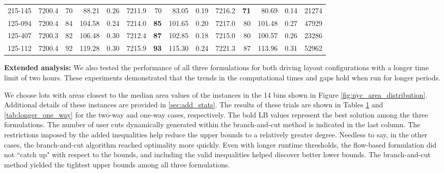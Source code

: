 \documentclass[10pt]{article}
\theoremstyle{definition}
\begin{document}
\begin{table}[H]
\begin{tabular}{l|rrrr|rrrr|rrrrr}
    215-145 & 7200.4 & 70    & 88.21 & 0.26  & 7211.9 & 70    & 83.05 & 0.19  & 7216.2 & \textbf{71} & 80.69 & 0.14  & 21274 \\
    125-094 & 7200.4 & 84    & 104.58 & 0.24  & 7214.0 & \textbf{85} & 101.65 & 0.20  & 7217.0 & 80    & 101.48 & 0.27  & 47929 \\
    125-407 & 7200.3 & 82    & 106.48 & 0.30  & 7212.4 & \textbf{87} & 102.85 & 0.18  & 7215.0 & 80    & 100.57 & 0.26  & 23286 \\
    125-112 & 7200.4 & 92    & 119.28 & 0.30  & 7215.9 & \textbf{93} & 115.30 & 0.24  & 7221.3 & 87    & 113.96 & 0.31  & 52962 \\
    \hline
    \end{tabular}%
  \label{tab:longer_two_way}%
\end{table}%


\textbf{Extended analysis: }We also tested the performance of all three formulations for both driving layout configurations with a longer time limit of two hours. These experiments demonstrated that the trends in the computational times and gaps hold when run for longer periods. 

We choose lots with areas closest to the median area values of the instances in the 14 bins shown in Figure \ref{fig:nyc_area_distribution}. Additional details of these instances are provided in \ref{sec:add_stats}. The results of these trials are shown in Tables \ref{tab:longer_two_way} and \ref{tab:longer_one_way} for the two-way and one-way cases, respectively. The bold LB values represent the best solution among the three formulations. The number of user cuts dynamically generated within the branch-and-cut method is indicated in the last column. The restrictions imposed by the added inequalities help reduce the upper bounds to a relatively greater degree. Needless to say, in the other cases, the branch-and-cut algorithm reached optimality more quickly. Even with longer runtime thresholds, the flow-based formulation did not ``catch up" with respect to the bounds, and including the valid inequalities helped discover better lower bounds. The branch-and-cut method yielded the tightest upper bounds among all three formulations.
\end{document}

